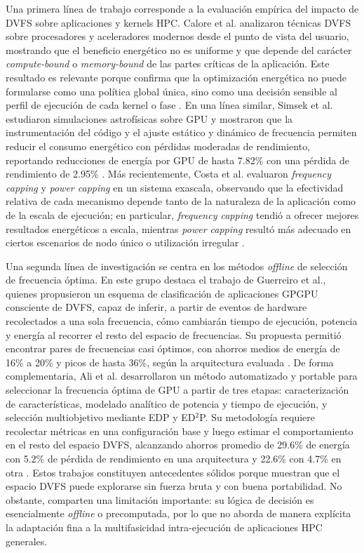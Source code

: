 \documentclass[12pt,oneside,spanish]{book}
\begin{document}
Una primera línea de trabajo corresponde a la evaluación empírica del impacto de DVFS sobre aplicaciones y kernels HPC. Calore et al. analizaron técnicas DVFS sobre procesadores y aceleradores modernos desde el punto de vista del usuario, mostrando que el beneficio energético no es uniforme y que depende del carácter \textit{compute-bound} o \textit{memory-bound} de las partes críticas de la aplicación. Este resultado es relevante porque confirma que la optimización energética no puede formularse como una política global única, sino como una decisión sensible al perfil de ejecución de cada kernel o fase \cite{Calore2017}. En una línea similar, Simsek et al. estudiaron simulaciones astrofísicas sobre GPU y mostraron que la instrumentación del código y el ajuste estático y dinámico de frecuencia permiten reducir el consumo energético con pérdidas moderadas de rendimiento, reportando reducciones de energía por GPU de hasta 7.82\% con una pérdida de rendimiento de 2.95\% \cite{Simsek2024}. Más recientemente, Costa et al. evaluaron \textit{frequency capping} y \textit{power capping} en un sistema exascala, observando que la efectividad relativa de cada mecanismo depende tanto de la naturaleza de la aplicación como de la escala de ejecución; en particular, \textit{frequency capping} tendió a ofrecer mejores resultados energéticos a escala, mientras \textit{power capping} resultó más adecuado en ciertos escenarios de nodo único o utilización irregular \cite{Costa2025}.

Una segunda línea de investigación se centra en los métodos \textit{offline} de selección de frecuencia óptima. En este grupo destaca el trabajo de Guerreiro et al., quienes propusieron un esquema de clasificación de aplicaciones GPGPU consciente de DVFS, capaz de inferir, a partir de eventos de hardware recolectados a una sola frecuencia, cómo cambiarán tiempo de ejecución, potencia y energía al recorrer el resto del espacio de frecuencias. Su propuesta permitió encontrar pares de frecuencias casi óptimos, con ahorros medios de energía de 16\% a 20\% y picos de hasta 36\%, según la arquitectura evaluada \cite{Guerreiro2019}. De forma complementaria, Ali et al. desarrollaron un método automatizado y portable para seleccionar la frecuencia óptima de GPU a partir de tres etapas: caracterización de características, modelado analítico de potencia y tiempo de ejecución, y selección multiobjetivo mediante EDP y ED$^{2}$P. Su metodología requiere recolectar métricas en una configuración base y luego estimar el comportamiento en el resto del espacio DVFS, alcanzando ahorros promedio de 29.6\% de energía con 5.2\% de pérdida de rendimiento en una arquitectura y 22.6\% con 4.7\% en otra \cite{Ali2023}. Estos trabajos constituyen antecedentes sólidos porque muestran que el espacio DVFS puede explorarse sin fuerza bruta y con buena portabilidad. No obstante, comparten una limitación importante: su lógica de decisión es esencialmente \textit{offline} o precomputada, por lo que no aborda de manera explícita la adaptación fina a la multifasicidad intra-ejecución de aplicaciones HPC generales.
\end{document}
